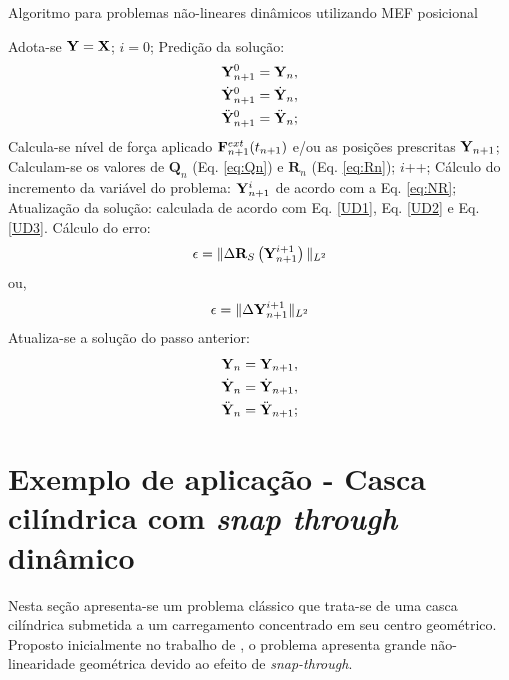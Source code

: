 \documentclass[tese_patricia]{subfiles}
\begin{document}
\begin{algorithm}
	\caption{Algoritmo para problemas não-lineares dinâmicos utilizando MEF posicional}
	\label{alg:algoritmo_solid}
	\begin{algorithmic}[1]
		\State Adota-se $\mathbf{Y} = \mathbf{X}$;
		\State $i=0$;
		\State Predição da solução: 
		\begin{align}
		\mathbf{Y}_{n+1}^{0} = \mathbf{Y}_{n},\\
		\dot{\mathbf{Y}}_{n+1}^{0} = \dot{\mathbf{Y}}_{n},\\
		\ddot{\mathbf{Y}}_{n+1}^{0} = \ddot{\mathbf{Y}}_{n};
		\end{align}
		\State Calcula-se  nível de força aplicado $\mathbf{F}^{ext}_{n+1}(t_{n+1})$ e/ou as posições prescritas $\mathbf{Y}_{n+1}$;
		\State Calculam-se os valores de $\mathbf{Q}_n$ (Eq. \eqref{eq:Qn}) e $\mathbf{R}_n$ (Eq. \eqref{eq:Rn});
		\State $i$++;
		\State Cálculo do incremento da variável do problema: $\mathbf{Y}_{n+1}^{i}$ de acordo com a Eq. \eqref{eq:NR};
		\State Atualização da solução: calculada de acordo com Eq. \eqref{UD1}, Eq. \eqref{UD2} e Eq. \eqref{UD3}.
		\State Cálculo do erro:
		\begin{align}
		\epsilon = \lVert \Delta\mathbf{R}_S\left(\mathbf{Y}_{n+1}^{i+1}\right) \lVert_{L^2} 
		\end{align}
		ou,
		\begin{align}
		\epsilon = \lVert\Delta\mathbf{Y}_{n+1}^{i+1}\lVert_{L^2} 
		\end{align}
		\EndWhile
		\State Atualiza-se a solução do passo anterior:
		\begin{align}
		\mathbf{Y}_{n} = \mathbf{Y}_{n+1},\\
		\dot{\mathbf{Y}}_{n} = \dot{\mathbf{Y}}_{n+1},\\
		\ddot{\mathbf{Y}}_{n} = \ddot{\mathbf{Y}}_{n+1};
		\end{align}
		\EndFor
	\end{algorithmic}
\end{algorithm}

\section{Exemplo de aplicação - Casca cilíndrica com \textit{snap through} dinâmico}


Nesta seção apresenta-se um problema clássico que trata-se de uma casca cilíndrica submetida a um carregamento concentrado em seu centro geométrico. Proposto inicialmente no trabalho de 
\cite{KuhlR:1999}, o problema apresenta grande não-linearidade geométrica devido ao efeito de \textit{snap-through}. 
\end{document}
